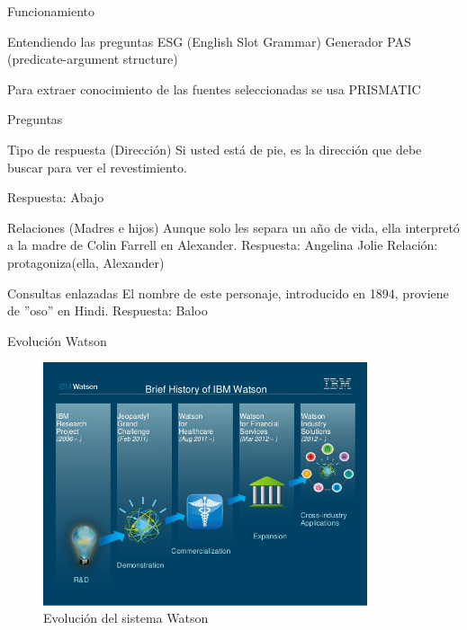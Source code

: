 \documentclass[compress]{beamer}
\begin{document}
\begin{frame}{Funcionamiento}
	\begin{block}{Entendiendo las preguntas}
		ESG (English Slot Grammar)
		Generador PAS (predicate-argument structure)
		
		Para extraer conocimiento de
		las fuentes seleccionadas se usa PRISMATIC
	\end{block}
\end{frame}


\begin{frame}{Preguntas}
	\begin{exampleblock}{Tipo de respuesta (Dirección)}		
		Si usted está de pie, es la dirección que debe buscar para ver el revestimiento.
		
		Respuesta: Abajo
	\end{exampleblock}	

	\begin{exampleblock}{Relaciones (Madres e hijos)}
		Aunque solo les separa un año de vida, ella interpretó a la madre de Colin Farrell en Alexander.
		Respuesta: Angelina Jolie
		Relación: protagoniza(ella, Alexander)
	\end{exampleblock}
	
	\begin{exampleblock}{Consultas enlazadas}
		El nombre de este personaje, introducido en 1894, proviene de ”oso” en Hindi.
		Respuesta: Baloo
	\end{exampleblock}
\end{frame}

\begin{frame}{Evolución Watson}
	\begin{figure}[H]
		\centering
		\label{watson2today}
		\includegraphics[trim = 0mm 14mm 0mm 10mm, clip, width=0.85\textwidth]{./Imagenes/watson2today.jpg}
		\caption{Evolución del sistema Watson}
	\end{figure}
\end{frame}
\end{document}
